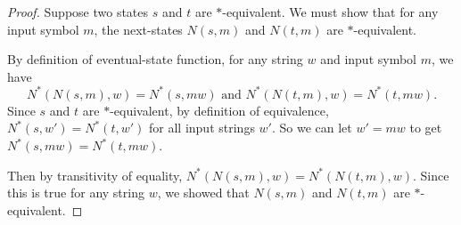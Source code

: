 \documentclass[14pt]{extarticle}
\begin{document}
\begin{proof}
Suppose two states \(s\) and \(t\) are \(*\)-equivalent. We must show that for any input symbol \(m\), the next-states 
\(N(s, m)\) and \(N(t, m)\) are \(*\)-equivalent. 

By definition of eventual-state function, for any string \(w\) and input symbol \(m\), we have 
\[
N^*(N(s, m), w) = N^*(s, mw) \text{ and } N^*(N(t, m), w) = N^*(t, mw).
\]
Since \(s\) and \(t\) are \(*\)-equivalent, by definition of equivalence, \(N^*(s, w') = N^*(t, w')\) for all input strings 
\(w'\). So we can let \(w' = mw\) to get \(N^*(s, mw) = N^*(t, mw)\).

Then by transitivity of equality, \(N^*(N(s, m), w) = N^*(N(t, m), w)\). Since this is true for any string \(w\), we showed
that \(N(s, m)\) and \(N(t, m)\) are \(*\)-equivalent. 
\end{proof}
\end{document}
